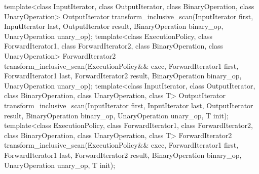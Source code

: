 %
\begin{itemdecl}
template<class InputIterator, class OutputIterator,
         class BinaryOperation, class UnaryOperation>
  OutputIterator transform_inclusive_scan(InputIterator first, InputIterator last,
                                          OutputIterator result,
                                          BinaryOperation binary_op,
                                          UnaryOperation unary_op);
template<class ExecutionPolicy,
         class ForwardIterator1, class ForwardIterator2,
         class BinaryOperation, class UnaryOperation>
  ForwardIterator2 transform_inclusive_scan(ExecutionPolicy&& exec,
                                            ForwardIterator1 first, ForwardIterator1 last,
                                            ForwardIterator2 result,
                                            BinaryOperation binary_op,
                                            UnaryOperation unary_op);
template<class InputIterator, class OutputIterator,
         class BinaryOperation, class UnaryOperation, class T>
  OutputIterator transform_inclusive_scan(InputIterator first, InputIterator last,
                                          OutputIterator result,
                                          BinaryOperation binary_op,
                                          UnaryOperation unary_op,
                                          T init);
template<class ExecutionPolicy,
         class ForwardIterator1, class ForwardIterator2,
         class BinaryOperation, class UnaryOperation, class T>
  ForwardIterator2 transform_inclusive_scan(ExecutionPolicy&& exec,
                                            ForwardIterator1 first, ForwardIterator1 last,
                                            ForwardIterator2 result,
                                            BinaryOperation binary_op,
                                            UnaryOperation unary_op,
                                            T init);
\end{itemdecl}

